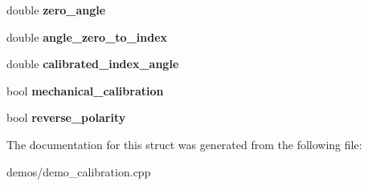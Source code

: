 \begin{DoxyCompactItemize}
\item 
double {\bfseries zero\+\_\+angle}\hypertarget{structRobot_aee76416f855270701fee8aa214498503}{}\label{structRobot_aee76416f855270701fee8aa214498503}

\item 
double {\bfseries angle\+\_\+zero\+\_\+to\+\_\+index}\hypertarget{structRobot_a8541af2f9b418958dd73548dde285a51}{}\label{structRobot_a8541af2f9b418958dd73548dde285a51}

\item 
double {\bfseries calibrated\+\_\+index\+\_\+angle}\hypertarget{structRobot_a29f1467dddd5df0bfce7de3efd70ddcf}{}\label{structRobot_a29f1467dddd5df0bfce7de3efd70ddcf}

\item 
bool {\bfseries mechanical\+\_\+calibration}\hypertarget{structRobot_a57c270424cc00ece6cee9a31011a14f3}{}\label{structRobot_a57c270424cc00ece6cee9a31011a14f3}

\item 
bool {\bfseries reverse\+\_\+polarity}\hypertarget{structRobot_a9b4527aa61e8070712c8140b940cb5f2}{}\label{structRobot_a9b4527aa61e8070712c8140b940cb5f2}

\end{DoxyCompactItemize}


The documentation for this struct was generated from the following file\+:\begin{DoxyCompactItemize}
\item 
demos/demo\+\_\+calibration.\+cpp\end{DoxyCompactItemize}

